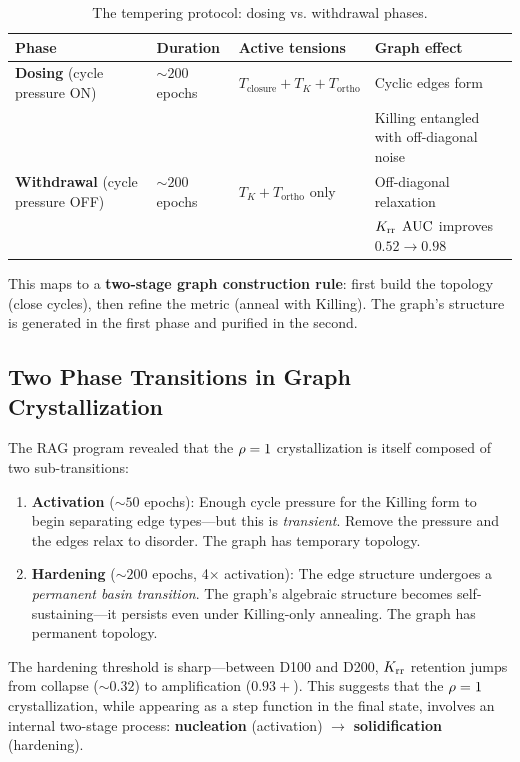 \begin{table}[h]
\fontsize{7pt}{10pt}\selectfont
\centering
\begin{tabular}{l l l l}
\hline\hline
Phase & Duration & Active tensions & Graph effect \\
\hline
\textbf{Dosing} (cycle pressure ON) & $\sim\!200$ epochs & $T_{\mathrm{closure}} + T_K + T_{\mathrm{ortho}}$ & Cyclic edges form \\
\quad & \quad & \quad & Killing entangled with off-diagonal noise \\
\textbf{Withdrawal} (cycle pressure OFF) & $\sim\!200$ epochs & $T_K + T_{\mathrm{ortho}}$ only & Off-diagonal relaxation \\
\quad & \quad & \quad & $K_{\mathrm{rr}}$ $\mathrm{AUC}$ improves $0.52 \to 0.98$ \\
\hline\hline
\end{tabular}
\caption{The tempering protocol: dosing vs. withdrawal phases.}
\end{table}

This maps to a \textbf{two-stage graph construction rule}: first build the topology (close cycles), then refine the metric (anneal with Killing). The graph's structure is generated in the first phase and purified in the second.

\subsection{Two Phase Transitions in Graph Crystallization}\label{sec:two_phase_crystallization}

The RAG program revealed that the $\rho = 1$ crystallization is itself composed of two sub-transitions:

\begin{enumerate}
    \item \textbf{Activation} ($\sim\!50$ epochs): Enough cycle pressure for the Killing form to begin separating edge types---but this is \emph{transient}. Remove the pressure and the edges relax to disorder. The graph has temporary topology.
    
    \item \textbf{Hardening} ($\sim\!200$ epochs, 4$\times$ activation): The edge structure undergoes a \emph{permanent basin transition}. The graph's algebraic structure becomes self-sustaining---it persists even under Killing-only annealing. The graph has permanent topology.
\end{enumerate}

The hardening threshold is sharp---between D100 and D200, $K_{\mathrm{rr}}$ retention jumps from collapse ($\sim\!0.32$) to amplification ($0.93+$). This suggests that the $\rho = 1$ crystallization, while appearing as a step function in the final state, involves an internal two-stage process: \textbf{nucleation} (activation) $\to$ \textbf{solidification} (hardening).

